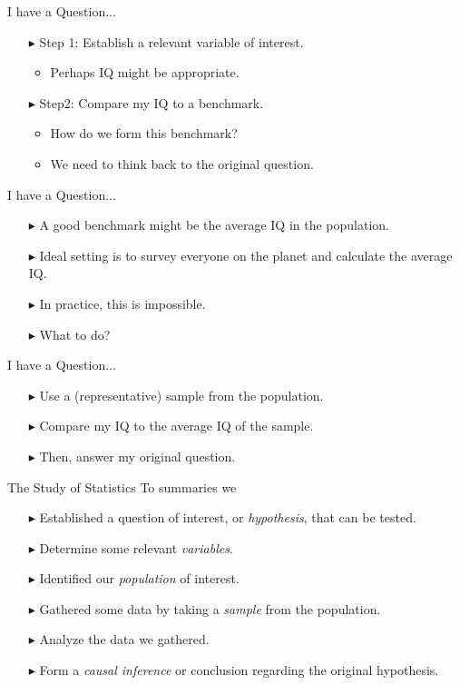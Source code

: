 \documentclass[12pt]{beamer}
\begin{document}
\begin{frame}{I have a Question...}
	\begin{itemize}
		\item[$\blacktriangleright$] Step 1: Establish a relevant variable of interest.
		\begin{itemize}
			\item Perhaps IQ might be appropriate.
		\end{itemize}
		\item[$\blacktriangleright$] Step2: Compare my IQ to a benchmark.
		\begin{itemize}
			\item How do we form this benchmark?
			\item We need to think back to the original question.
		\end{itemize}
	\end{itemize}
\end{frame}
\begin{frame}{I have a Question...}
	\begin{itemize}
		\item[$\blacktriangleright$] A good benchmark might be the average IQ in the population.
		\item[$\blacktriangleright$] Ideal setting is to survey everyone on the planet and calculate the average IQ.
		\item[$\blacktriangleright$] In practice, this is impossible.
		\item[$\blacktriangleright$] What to do?
	\end{itemize}
\end{frame}
\begin{frame}{I have a Question...}
	\begin{itemize}
		\item[$\blacktriangleright$] Use a (representative) sample from the population.
		\item[$\blacktriangleright$] Compare my IQ to the average IQ of the sample.
		\item[$\blacktriangleright$] Then, answer my original question.
	\end{itemize}
\end{frame}
\begin{frame}{The Study of Statistics}
	To summaries we
	\begin{itemize}
		\item[$\blacktriangleright$] Established a question of interest, or {\sl\color{red} hypothesis}, that can be tested.
		\item[$\blacktriangleright$] Determine some relevant {\sl\color{red} variables}.
		\item[$\blacktriangleright$] Identified our {\sl\color{red} population} of interest.
		\item[$\blacktriangleright$] Gathered some data by taking a {\sl\color{red} sample} from the population.
		\item[$\blacktriangleright$] Analyze the data we gathered.
		\item[$\blacktriangleright$] Form a {\sl\color{red}causal inference} or conclusion regarding the original hypothesis.
	\end{itemize}
\end{frame}
\end{document}
